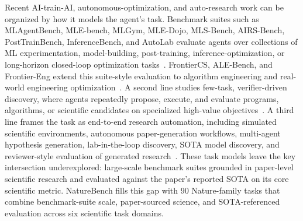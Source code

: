 Recent AI-train-AI, autonomous-optimization, and auto-research work can be organized by how it models the agent's task. Benchmark suites such as MLAgentBench, MLE-bench, MLGym, MLE-Dojo, MLS-Bench, AIRS-Bench, PostTrainBench, InferenceBench, and AutoLab evaluate agents over collections of ML experimentation, model-building, post-training, inference-optimization, or long-horizon closed-loop optimization tasks~\citep{huang2023mlagentbench,shern2024mlebench,nathani2025mlgym,qiang2026mle,lyu2026mlsbench,lupidi2026airsbench,rank2026posttrainbench,yeon2026inferencebench,xu2026autolab}. FrontierCS, ALE-Bench, and Frontier-Eng extend this suite-style evaluation to algorithm engineering and real-world engineering optimization~\citep{mang2025frontiercs,imajuku2025alebench,chi2026frontiereng}. A second line studies few-task, verifier-driven discovery, where agents repeatedly propose, execute, and evaluate programs, algorithms, or scientific candidates on specialized high-value objectives~\citep{fawzi2022alphatensor,romeraparedes2023funsearch,novikov2025alphaevolve,wang2025thetaevolve,yuksekgonul2026tttdiscover,ye2026simpletes,cemri2026adaevolve,liu2026evox,jiang2026deltaevolve,lin2026aevolve,liu2025deepevolve}. A third line frames the task as end-to-end research automation, including simulated scientific environments, autonomous paper-generation workflows, multi-agent hypothesis generation, lab-in-the-loop discovery, SOTA model discovery, and reviewer-style evaluation of generated research~\citep{jansen2024discoveryworld,lu2024aiscientist,gottweis2026coscientist,ghareeb2026robin,li2026autosota,weng2025deepscientist,zhang2026researcharena,lyu2026evoscientist,zhu2026evomaster}. These task models leave the key intersection underexplored: large-scale benchmark suites grounded in paper-level scientific research and evaluated against the paper's reported SOTA on its core scientific metric. NatureBench fills this gap with 90 Nature-family tasks that combine benchmark-suite scale, paper-sourced science, and SOTA-referenced evaluation across six scientific task domains.




 

 


